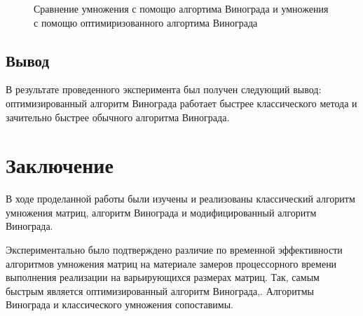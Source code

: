 \documentclass[12pt]{report}
\begin{document}
\begin{figure}[h!]
	\begin{center}
	\end{center}
	\caption{Сравнение умножения с помощю алгортима Винограда и умножения с помощю оптимиризованного алгортима Винограда}
\end{figure}

\newpage


\section{Вывод}

В результате проведенного эксперимента был получен следующий вывод: оптимизированный алгоритм Винограда работает быстрее классического метода и зачительно быстрее обычного алгоритма Винограда.


\chapter*{Заключение}

В ходе проделанной работы были изучены и реализованы классический алгоритм умножения матриц, алгоритм Винограда и модифицированный алгоритм Винограда. 

Экспериментально было подтверждено различие по временной эффективности алгоритмов умножения матриц на материале замеров процессорного времени выполнения реализации на варьирующихся размерах матриц. Так, самым быстрым является оптимизированный алгоритм Винограда,. Алгоритмы Винограда и классического умножения сопоставимы.
\end{document}
